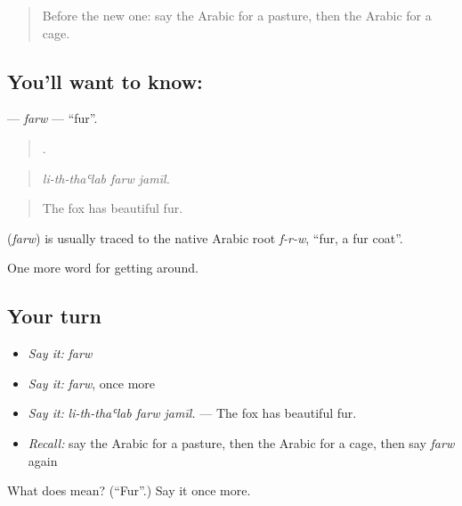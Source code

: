 \begin{quote}
Before the new one: say the Arabic for a pasture, then the Arabic for a cage.
\end{quote}

\subsection*{You'll want to know: }
\textbf{} — \emph{farw} — \textquotedblleft{}fur\textquotedblright{}.

\begin{quote}
  .
\end{quote}

\begin{quote}
\emph{li-th-thaʿlab farw jamīl.}
\end{quote}

\begin{quote}
The fox has beautiful fur.
\end{quote}

\begin{cousinweb}
\textbf{} (\emph{farw}) is usually traced to the native Arabic root \emph{f-r-w}, \textquotedblleft{}fur, a fur coat\textquotedblright{}.
\end{cousinweb}

\begin{grammarlens}[title={What you've built}]
One more word for getting around.
\end{grammarlens}

\subsection*{Your turn}
\begin{itemize}
\raggedright
  \item \emph{Say it:} \emph{farw}
  \item \emph{Say it:} \emph{farw}, once more
  \item \emph{Say it:} \emph{li-th-thaʿlab farw jamīl.} — The fox has beautiful fur.
  \item \emph{Recall:} say the Arabic for a pasture, then the Arabic for a cage, then say \emph{farw} again
\end{itemize}

\begin{tcolorbox}[breakable,colback=teal!4,colframe=teal!35!black,title={Before you move on}]
What does  mean? (\textquotedblleft{}Fur\textquotedblright{}.) Say it once more.
\end{tcolorbox}
